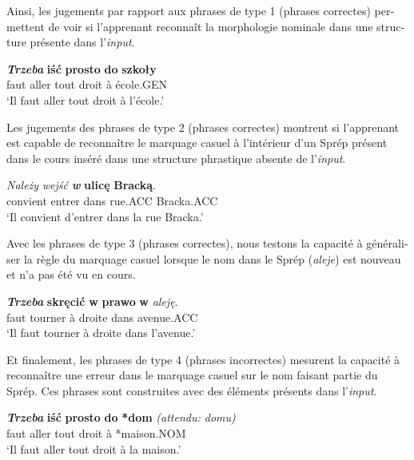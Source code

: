 \documentclass[output=paper]{langscibook}
\begin{document}
\begin{otherlanguage}{french}
Ainsi, les jugements par rapport aux phrases de type 1 (phrases correctes) permettent de voir si l’apprenant reconnaît la morphologie nominale dans une structure présente dans l’\textit{input}.

\ea%
    \label{ex:watorek:1}
\gll \textbf{\textit{Trzeba}}   \textbf{iść}   \textbf{prosto}     \textbf{do}   \textbf{szkoły}\footnotemark \\
faut     aller   {tout droit} à   {école.GEN}\\
\glt ‘Il faut aller tout droit à l’école.’
\z

Les jugements des phrases de type 2 (phrases correctes) montrent si l’apprenant est capable de reconnaître le marquage casuel à l’intérieur d’un Sprép présent dans le cours inséré dans une structure phrastique absente de l’\textit{input}.

\ea%
    \label{ex:watorek:2}
\gll \textit{Należy}   \textit{wejść} \textbf{\textit{w}}   \textbf{ulicę}     \textbf{Bracką}.\\
  convient   entrer     dans   rue.ACC   Bracka.ACC\\
\glt ‘Il convient d’entrer dans la rue Bracka.’
\z

Avec les phrases de type 3 (phrases correctes), nous testons la capacité à généraliser la règle du marquage casuel lorsque le nom dans le Sprép (\textit{aleje}) est nouveau et n’a pas été vu en cours.

\ea%
    \label{ex:watorek:3}
\gll \textbf{\textit{Trzeba}}   \textbf{skręcić}   \textbf{w}   \textbf{prawo}   \textbf{w} \textit{aleję}.\\
  faut     tourner   à   droite   dans   avenue.ACC\\
\glt ‘Il faut tourner à droite dans l’avenue.’
\z

Et finalement, les phrases de type 4 (phrases incorrectes) mesurent la capacité à reconnaître une erreur dans le marquage casuel sur le nom faisant partie du Sprép. Ces phrases sont construites avec des éléments présents dans l’\textit{input}.

\ea%
    \label{ex:watorek:4}
\gll \textbf{\textit{Trzeba}}   \textbf{iść}   \textbf{prosto}   \textbf{do}   \textbf{*dom}  \textit{(attendu: domu)}\\
  faut     aller   {tout droit} à   *maison.NOM \\
\glt ‘Il faut aller tout droit à la maison.’
\z


\end{otherlanguage}
\end{document}
